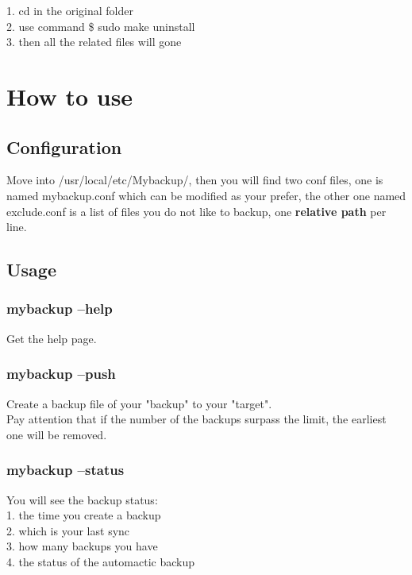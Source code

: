 \documentclass[a4paper]{article}
\begin{document}
            1. cd in the original folder \\
                2. use command \$ sudo make uninstall\\
                3. then all the related files will gone

                \section{How to use}

                \subsection{Configuration}

                Move into /usr/local/etc/Mybackup/, then you will find two conf files, 
                one is named mybackup.conf which can be modified as your prefer,
                the other one named exclude.conf is a list of files you do not like to backup,
                one \textbf{relative path} per line.

                \subsection{Usage}

                \subsubsection{mybackup --help}

                Get the help page.

                \subsubsection{mybackup --push}

                Create a backup file of your "backup" to your "target".\\
                    Pay attention that if the number of the backups surpass the limit, the earliest one will be removed.

                    \subsubsection{mybackup --status}

                    You will see the backup status: \\
                        1. the time you create a backup\\
                        2. which is your last sync\\
                        3. how many backups you have\\
                        4. the status of the automactic backup
\end{document}
